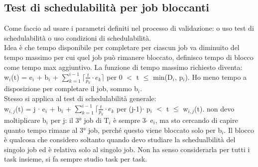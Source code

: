 \documentclass[12pt, oneside]{extbook}
\begin{document}
\subsection{Test di schedulabilità per job bloccanti}
Come faccio ad usare i parametri definiti nel processo di validazione: o uso test di schedulabilità o uso condizioni di schedulabilità.\\ Idea è che tempo disponibile per completare per ciascun job va diminuito del tempo massimo per cui quel job può rimanere bloccato, definisco tempo di blocco come tempo max aggiuntivo. La funzione di tempo massimo richiesto diventa:\\
w$_{i}$(t) = e$_{i}$ + b$_{i}$ + $\sum\limits_{k = 1}^{i-1}\lceil \frac{t}{p_{k}} \cdot e_{k} \rceil$ per 0 $<$ t $\leq$ min(D$_{i}$, p$_{i}$). Ho meno tempo a disposizione per completare il job, sommo b$_{i}$.\\ Stesso si applica al test di schedulabilità generale:\\
w$_{i,j}$(t) = j $\cdot$ e$_{i}$ + b$_{i}$ + $\sum\limits_{k = 1}^{i-1}\lceil \frac{t}{p_{k}} \cdot e_{k}$  per (j-1)$\cdot$ p$_{i}$ $<$ t $\leq$ w$_{i,j}$(t). non devo moltiplicare b$_{i}$ per j: il 3° job di T$_{i}$ è sempre 3$ \cdot$ e$_{i}$, ma sto cercando di capire quanto tempo rimane al 3° job, perché questo viene bloccato solo per b$_{i}$. Il blocco è qualcosa che considero soltanto quando devo studiare la schedualbilità del singolo job ed è relativa solo al singolo job. Non ha senso considerarla per tutti i task insieme, si fa sempre studio task per task.
\end{document}
